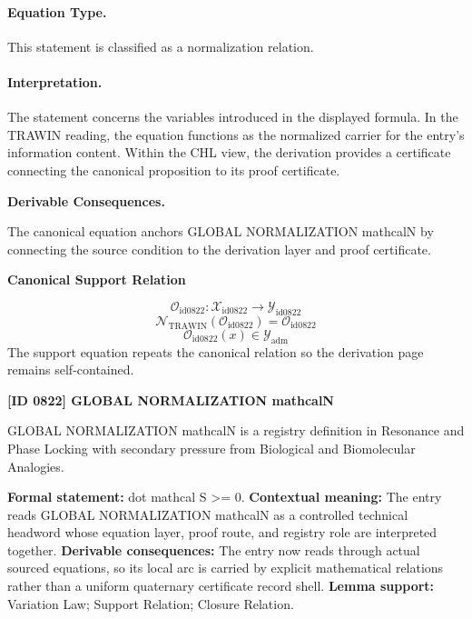 \paragraph{Equation Type.}
This statement is classified as a normalization relation.

\paragraph{Interpretation.}
The statement concerns the variables introduced in the displayed formula. In the TRAWIN reading, the equation functions as the normalized carrier for the entry’s information content. Within the CHL view, the derivation provides a certificate connecting the canonical proposition to its proof certificate.

\par\vspace{0.35em}
\noindent\textbf{Derivable Consequences.}\quad
\begingroup
\footnotesize
\raggedright
The canonical equation anchors GLOBAL NORMALIZATION mathcalN by connecting the source condition to the derivation layer and proof certificate.
\par\endgroup

\noindent\textbf{Canonical Support Relation}\par
\[
\mathcal{O}_{\mathrm{id0822}}:\mathcal{X}_{\mathrm{id0822}}\longrightarrow\mathcal{Y}_{\mathrm{id0822}}
\]
\[
\mathcal{N}_{\mathrm{TRAWIN}}(\mathcal{O}_{\mathrm{id0822}})=\mathcal{O}_{\mathrm{id0822}}
\]
\[
\mathcal{O}_{\mathrm{id0822}}(x)\in\mathcal{Y}_{\mathrm{adm}}
\]
\noindent The support equation repeats the canonical relation so the derivation page remains self-contained.\par

\clearpage
\noindent\textbf{[ID 0822] GLOBAL NORMALIZATION mathcalN}\par
\vspace{0.35em}
\begingroup\small
{}
GLOBAL NORMALIZATION mathcalN is a registry definition in Resonance and Phase Locking with secondary pressure from Biological and Biomolecular Analogies.

\begingroup\footnotesize\setlength{\emergencystretch}{3em}\sloppy
\textbf{Formal statement:} dot mathcal S >= 0. \textbf{Contextual meaning:} The entry reads GLOBAL NORMALIZATION mathcalN as a controlled technical headword whose equation layer, proof route, and registry role are interpreted together. \textbf{Derivable consequences:} The entry now reads through actual sourced equations, so its local arc is carried by explicit mathematical relations rather than a uniform quaternary certificate record shell. \textbf{Lemma support:} Variation Law; Support Relation; Closure Relation.\par
\endgroup

